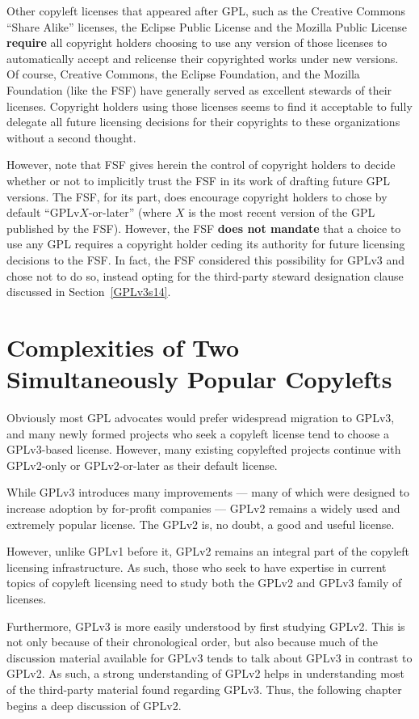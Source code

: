 Other copyleft licenses that appeared after GPL, such
as the Creative Commons ``Share Alike'' licenses, the Eclipse Public License
and the Mozilla Public License \textbf{require} all copyright holders choosing
to use any version of those licenses to automatically accept and relicense
their copyrighted works under new versions.  Of course, Creative Commons, the
Eclipse Foundation, and the Mozilla Foundation (like the FSF) have generally
served as excellent stewards of their licenses.  Copyright holders using
those licenses seems to find it acceptable to fully delegate all future
licensing decisions for their copyrights to these organizations without a
second thought.

However, note that FSF gives herein the control of copyright holders to
decide whether or not to implicitly trust the FSF in its work of drafting
future GPL versions.  The FSF, for its part, does encourage copyright holders
to chose by default ``GPLv$X$-or-later'' (where $X$ is the most recent
version of the GPL published by the FSF).  However, the FSF \textbf{does not
  mandate} that a choice to use any GPL requires a copyright holder ceding
its authority for future licensing decisions to the FSF.  In fact, the FSF
considered this possibility for GPLv3 and chose not to do so, instead opting
for the third-party steward designation clause discussed in
Section~\ref{GPLv3s14}.

\section{Complexities of Two Simultaneously Popular Copylefts}

Obviously most GPL advocates would prefer widespread migration to GPLv3, and
many newly formed projects who seek a copyleft license tend to choose a
GPLv3-based license.  However, many existing copylefted projects continue
with GPLv2-only or GPLv2-or-later as their default license.

While GPLv3 introduces many improvements --- many of which were designed to
increase adoption by for-profit companies --- GPLv2 remains a widely used and
extremely popular license.  The GPLv2 is, no doubt, a good and useful
license.

However, unlike GPLv1 before it,
GPLv2 remains an integral part of the copyleft licensing infrastructure.  As such, those who seek to have expertise in current
topics of copyleft licensing need to study both the GPLv2 and GPLv3 family of
licenses.

Furthermore, GPLv3 is more easily understood by first studying GPLv2.
This is not only because of their chronological order, but also because much
of the discussion material available for GPLv3 tends to talk about GPLv3 in
contrast to GPLv2.  As such, a strong understanding of GPLv2 helps in
understanding most of the third-party material found regarding GPLv3.  Thus,
the following chapter begins a deep discussion of GPLv2.

